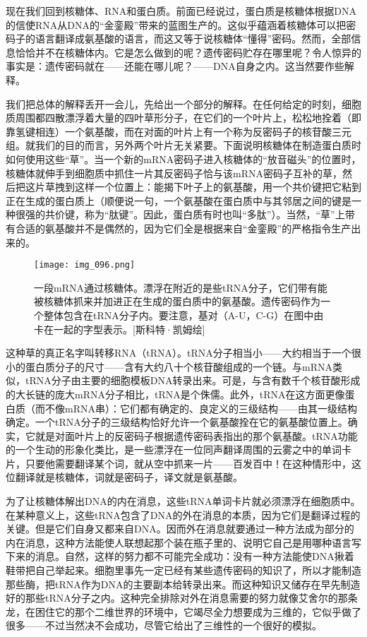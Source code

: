 现在我们回到核糖体、RNA和蛋白质。前面已经说过，蛋白质是核糖体根据DNA的信使RNA从DNA的“金銮殿”带来的蓝图生产的。这似乎蕴涵着核糖体可以把密码子的语言翻译成氨基酸的语言，而这又等于说核糖体“懂得”密码。然而，全部信息恰恰并不在核糖体内。它是怎么做到的呢？遗传密码贮存在哪里呢？令人惊异的事实是：遗传密码就在——还能在哪儿呢？——DNA自身之内。这当然要作些解释。

我们把总体的解释丢开一会儿，先给出一个部分的解释。在任何给定的时刻，细胞质周围都四散漂浮着大量的四叶草形分子，在它们的一个叶片上，松松地拴着（即靠氢键相连）一个氨基酸，而在对面的叶片上有一个称为反密码子的核苷酸三元组。就我们的目的而言，另外两个叶片无关紧要。下面说明核糖体在制造蛋白质时如何使用这些“草”。当一个新的mRNA密码子进入核糖体的“放音磁头”的位置时，核糖体就伸手到细胞质中抓住一片其反密码子恰与该mRNA密码子互补的草，然后把这片草拽到这样一个位置上：能揭下叶子上的氨基酸，用一个共价键把它粘到正在生成的蛋白质上（顺便说一句，一个氨基酸在蛋白质中与其邻居之间的键是一种很强的共价键，称为“肽键”。因此，蛋白质有时也叫“多肽”）。当然，“草”上带有合适的氨基酸并不是偶然的，因为它们全是根据来自“金銮殿”的严格指令生产出来的。

\begin{figure}
\texttt{[image: img\_096.png]}
\caption[一段mRNA通过核糖体。]
  {一段mRNA通过核糖体。漂浮在附近的是些tRNA分子，它们带有能被核糖体抓来并加进正在生成的蛋白质中的氨基酸。遗传密码作为一个整体包含在tRNA分子内。要注意，基对（A-U，C-G）在图中由卡在一起的字型表示。[斯科特·凯姆绘]}
\end{figure}

这种草的真正名字叫转移RNA（tRNA）。tRNA分子相当小——大约相当于一个很小的蛋白质分子的尺寸——含有大约八十个核苷酸组成的一个链。与mRNA类似，tRNA分子由主要的细胞模板DNA转录出来。可是，与含有数千个核苷酸形成的大长链的庞大mRNA分子相比，tRNA是个侏儒。此外，tRNA在这方面更像蛋白质（而不像mRNA串）：它们都有确定的、良定义的三级结构——由其一级结构确定。一个tRNA分子的三级结构恰好允许一个氨基酸拴在它的氨基酸位置上。确实，它就是对面叶片上的反密码子根据遗传密码表指出的那个氨基酸。tRNA功能的一个生动的形象化类比，是一些漂浮在一位同声翻译周围的云雾之中的单词卡片，只要他需要翻译某个词，就从空中抓来一片——百发百中！在这种情形中，这位翻译就是核糖体，词就是密码子，译文就是氨基酸。

为了让核糖体解出DNA的内在消息，这些tRNA单词卡片就必须漂浮在细胞质中。在某种意义上，这些tRNA包含了DNA的外在消息的本质，因为它们是翻译过程的关键。但是它们自身又都来自DNA。因而外在消息就要通过一种方法成为部分的内在消息，这种方法能使人联想起那个装在瓶子里的、说明它自己是用哪种语言写下来的消息。自然，这样的努力都不可能完全成功：没有一种方法能使DNA揪着鞋带把自己举起来。细胞里事先一定已经有某些遗传密码的知识了，所以才能制造那些酶，把tRNA作为DNA的主要副本给转录出来。而这种知识又储存在早先制造好的那些tRNA分子之内。这种完全排除对外在消息需要的努力就像艾舍尔的那条龙，在困住它的那个二维世界的环境中，它竭尽全力想要成为三维的，它似乎做了很多——不过当然决不会成功，尽管它给出了三维性的一个很好的模拟。


